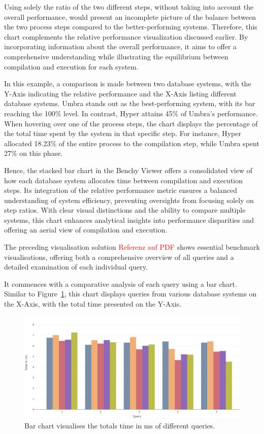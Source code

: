Using solely the ratio of the two different steps, without taking into account the overall performance, would present an incomplete picture of the balance between the two process steps compared to the better-performing systems. Therefore, this chart complements the relative performance visualization discussed earlier. By incorporating information about the overall performance, it aims to offer a comprehensive understanding while illustrating the equilibrium between compilation and execution for each system.

In this example, a comparison is made between two database systems, with the Y-Axis indicating the relative performance and the X-Axis listing different database systems. Umbra stands out as the best-performing system, with its bar reaching the 100\% level. In contrast, Hyper attains 45\% of Umbra's performance. When hovering over one of the process steps, the chart displays the percentage of the total time spent by the system in that specific step. For instance, Hyper allocated 18.23\% of the entire process to the compilation step, while Umbra spent 27\% on this phase.

Hence, the stacked bar chart in the Benchy Viewer offers a consolidated view of how each database system allocates time between compilation and execution steps. Its integration of the relative performance metric ensures a balanced understanding of system efficiency, preventing oversights from focusing solely on step ratios. With clear visual distinctions and the ability to compare multiple systems, this chart enhances analytical insights into performance disparities and offering an aerial view of compilation and execution.

The preceding visualisation solution \textcolor{red}{Referenz auf PDF} shows essential benchmark visualisations, offering both a comprehensive overview of all queries and a detailed examination of each individual query.

It commences with a comparative analysis of each query using a bar chart. Similar to Figure~\ref{fig:bar-chart}, this chart displays queries from various database systems on the X-Axis, with the total time presented on the Y-Axis. 

\begin{figure}[h]
    \centering
    \includegraphics[width=1\linewidth]{figures/bsp-bar.png}
    \caption{Bar chart visualises the totals time in ms of different queries.}
    \label{fig:bar-chart}
  \end{figure}

